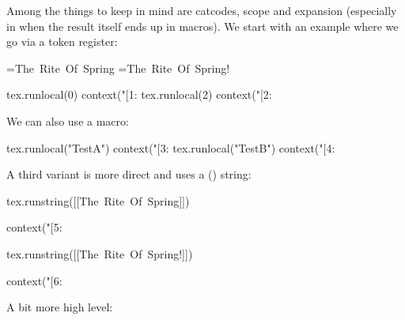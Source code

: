 Among the things to keep in mind are catcodes, scope and expansion (especially in
when the result itself ends up in macros). We start with an example where we go via
a token register:

\startbuffer[set]
={\hbox{The Rite Of Spring}}
={\hbox{The Rite Of Spring!}}
\stopbuffer

\typebuffer[set][option=TEX]

\startbuffer[run]
\startluacode
tex.runlocal(0) context("[1: %
tex.runlocal(2) context("[2: %
\stopluacode
\stopbuffer

\typebuffer[run][option=TEX]

\start {} \stop

We can also use a macro:

\startbuffer[set]
\def\TestB{\setbox0\hbox{The Rite Of Spring!}}
\stopbuffer

\typebuffer[set][option=TEX]

\startbuffer[run]
\startluacode
tex.runlocal("TestA") context("[3: %
tex.runlocal("TestB") context("[4: %
\stopluacode
\stopbuffer

\typebuffer[run][option=TEX]

\start {} \stop

A third variant is more direct and uses a (\LUA) string:

\startbuffer[run]
\startluacode
tex.runstring([[\hbox{The Rite Of Spring}]])

context("[5: %

tex.runstring([[\hbox{The Rite Of Spring!}]])

context("[6: %
\stopluacode
\stopbuffer

\typebuffer[run][option=TEX]

\start \getbuffer[run] \stop

A bit more high level:

